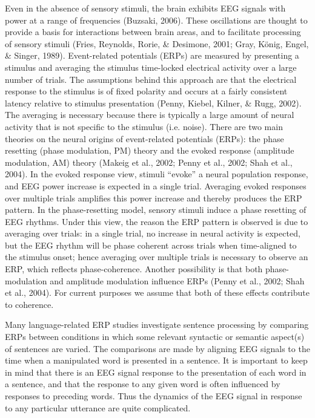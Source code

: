 Even in the absence of sensory stimuli, the brain exhibits EEG signals with power at a range of frequencies (Buzsaki, 2006). These oscillations are thought to provide a basis for interactions between brain areas, and to facilitate processing of sensory stimuli (Fries, Reynolds, Rorie, \& Desimone, 2001; Gray, König, Engel, \& Singer, 1989). Event-related potentials (ERPs) are measured by presenting a stimulus and averaging the stimulus time-locked electrical activity over a large number of trials. The assumptions behind this approach are that the electrical response to the stimulus is of fixed polarity and occurs at a fairly consistent latency relative to stimulus presentation (Penny, Kiebel, Kilner, \& Rugg, 2002). The averaging is necessary because there is typically a large amount of neural activity that is not specific to the stimulus (i.e. noise). There are two main theories on the neural origins of event-related potentials (ERPs): the phase resetting (phase modulation, PM) theory and the evoked response (amplitude modulation, AM) theory (Makeig et al., 2002; Penny et al., 2002; Shah et al., 2004). In the evoked response view, stimuli “evoke” a neural population response, and EEG power increase is expected in a single trial. Averaging evoked responses over multiple trials amplifies this power increase and thereby produces the ERP pattern. In the phase-resetting model, sensory stimuli induce a phase resetting of EEG rhythms. Under this view, the reason the ERP pattern is observed is due to averaging over trials: in a single trial, no increase in neural activity is expected, but the EEG rhythm will be phase coherent across trials when time-aligned to the stimulus onset; hence averaging over multiple trials is necessary to observe an ERP, which reflects phase-coherence. Another possibility is that both phase-modulation and amplitude modulation influence ERPs (Penny et al., 2002; Shah et al., 2004). For current purposes we assume that both of these effects contribute to coherence. 

  Many language-related ERP studies investigate sentence processing by comparing ERPs between conditions in which some relevant syntactic or semantic aspect(s) of sentences are varied. The comparisons are made by aligning EEG signals to the time when a manipulated word is presented in a sentence. It is important to keep in mind that there is an EEG signal response to the presentation of each word in a sentence, and that the response to any given word is often influenced by responses to preceding words. Thus the dynamics of the EEG signal in response to any particular utterance are quite complicated. 

